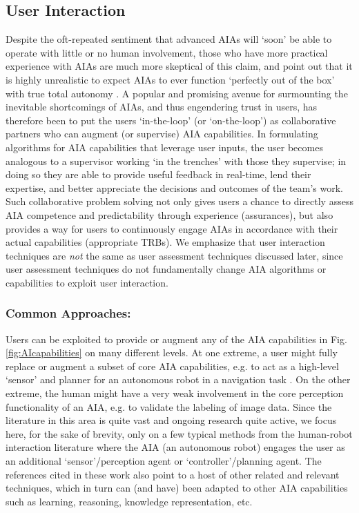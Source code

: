 \subsection{User Interaction} \label{sec:user_interaction}
Despite the oft-repeated sentiment that advanced AIAs will `soon' be able to operate with little or no human involvement, those who have more practical experience with AIAs are much more skeptical of this claim, and point out that it is highly unrealistic to expect AIAs to ever function `perfectly out of the box' with true total autonomy \cite{Bradshaw2013-ck}. 
A popular and promising avenue for surmounting the inevitable shortcomings of AIAs, and thus engendering trust in users, has therefore been to put the users `in-the-loop' (or `on-the-loop') as collaborative partners who can augment (or supervise) AIA capabilities. 
In formulating algorithms for AIA capabilities that leverage user inputs, the user becomes analogous to a supervisor working `in the trenches' with those they supervise; in doing so they are able to provide useful feedback in real-time, lend their expertise, and better appreciate the decisions and outcomes of the team's work. Such collaborative problem solving not only gives users a chance to directly assess AIA competence and predictability through experience (assurances), but also provides a way for users to continuously engage AIAs in accordance with their actual capabilities (appropriate TRBs). 
We emphasize that user interaction techniques are \emph{not} the same as user assessment techniques discussed later, since user assessment techniques do not fundamentally change AIA algorithms or capabilities to exploit user interaction.


\subsubsection{Common Approaches:} 
Users can be exploited to provide or augment any of the AIA capabilities in Fig. \ref{fig:AIcapabilities} on many different levels. 
At one extreme, a user might fully replace or augment a subset of core AIA capabilities, e.g. to act as a high-level `sensor' and planner for an autonomous robot in a navigation task \cite{Kaupp2008-yr}.  
On the other extreme, the human might have a very weak involvement in the core perception functionality of an AIA, e.g. to validate the labeling of image data. 
Since the literature in this area is quite vast and ongoing research quite active, we focus here, for the sake of brevity, only on a few typical methods from the human-robot interaction literature where the AIA (an autonomous robot) engages the user as an additional `sensor'/perception agent or `controller'/planning agent. The references cited in these work also point to a host of other related and relevant techniques, which in turn can (and have) been adapted to other AIA capabilities such as learning, reasoning, knowledge representation, etc.

